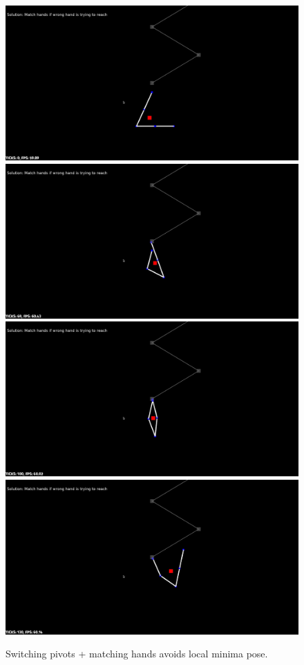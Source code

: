 \documentclass[12pt]{article}
\begin{document}
\begin{figure}[!htb]
\includegraphics[width=\linewidth]{figures/m1.jpg}
\endminipage\hfill
{}
\includegraphics[width=\linewidth]{figures/m2.jpg}
\endminipage\hfill
{}
\includegraphics[width=\linewidth]{figures/m3.jpg}
\endminipage\hfill
{}
\includegraphics[width=\linewidth]{figures/m4.jpg}
\endminipage\hfill
\caption{Switching pivots + matching hands avoids local minima pose.}
\label{fig:m}
\end{figure}
\end{document}

